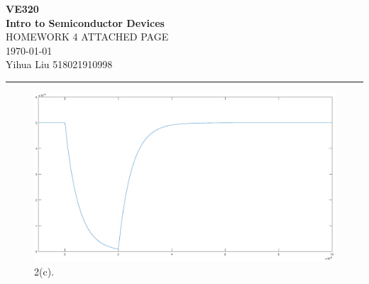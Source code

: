 \documentclass[a4paper]{article}
\begin{document}
\begin{center}
\huge
\textbf{VE320\\Intro to Semiconductor Devices\\}
\Large
\vspace{30pt}
\uppercase{Homework 4 Attached Page}\\
\vspace{5pt}\today\\
\vspace{5pt}
Yihua Liu 518021910998
\vspace{5pt}
\rule[-10pt]{.97\linewidth}{0.05em}
\end{center}
\begin{figure}[H]
    \centering
    \includegraphics[width=1\textwidth]{2(c).eps}
    \caption{2(c).}
\end{figure}
\end{document}
